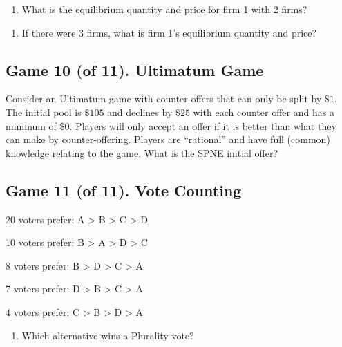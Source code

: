 \documentclass[11pt]{article}
\begin{document}
\begin{enumerate}[label=\alph*), start=3]
\item  What is the equilibrium quantity and price for firm 1 with 2 firms? \hfill \raisebox{-1ex}{\rule{4.2cm}{1pt}}

\end{enumerate}
\vspace{1cm}

\begin{enumerate}[label=\alph*), start=4]
\item  If there were 3 firms, what is firm 1’s equilibrium quantity and price? \hfill \raisebox{-1ex}{\rule{4.2cm}{1pt}}

\end{enumerate}

\pagebreak

\subsection*{Game 10 (of 11). Ultimatum Game
}
Consider an Ultimatum game with counter-offers that can only be split by $\$1$. The initial pool is $\$105$ and declines by $\$25$ with each counter offer and has a minimum of $\$0$. Players will only accept an offer if it is better than what they can make by counter-offering. Players are “rational” and have full (common) knowledge relating to the game. What is the SPNE initial offer? \hfill \raisebox{-1ex}{\rule{4.2cm}{1pt}}

\vspace{6cm}


\subsection*{Game 11 (of 11). Vote Counting
}
20 voters prefer: A > B > C > D

10 voters prefer: B > A > D > C

8 voters prefer: B > D > C > A

7 voters prefer: D > B > C > A

4 voters prefer: C > B > D > A

\begin{enumerate}[label=\alph*), start=1]
\item  Which alternative wins a Plurality vote? \hfill \raisebox{-1ex}{\rule{4.2cm}{1pt}}

\end{enumerate}
\vspace{1cm}
\end{document}
